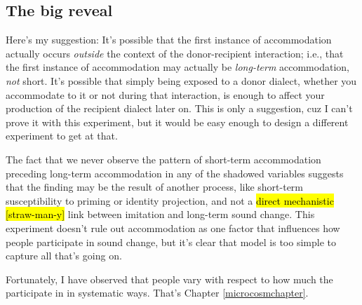     
    
    
\subsection{The big reveal}
    Here's my suggestion: It's possible that the first instance of accommodation actually occurs \emph{outside} the context of the donor-recipient interaction; i.e., that the first instance of accommodation may actually be \emph{long-term} accommodation, \emph{not} short. It's possible that simply being exposed to a donor dialect, whether you accommodate to it or not during that interaction, is enough to affect your production of the recipient dialect later on. This is only a suggestion, cuz I can't prove it with this experiment, but it would be easy enough to design a different experiment to get at that.

    The fact that we never observe the pattern of short-term accommodation preceding long-term accommodation in any of the shadowed variables %
    suggests that the finding may be the result of another process, like short-term susceptibility to priming or identity projection, and not a \hl{direct mechanistic [straw-man-y]} link between imitation and long-term sound change. This experiment doesn't rule out accommodation as one factor that influences how people participate in sound change, but it's clear that \cite['s]{trudgill1986dialects} model is too simple to capture all that's going on.
    
    Fortunately, I have observed that people vary with respect to how much the participate in \sla{} in systematic ways. That's Chapter \ref{microcosmchapter}.

